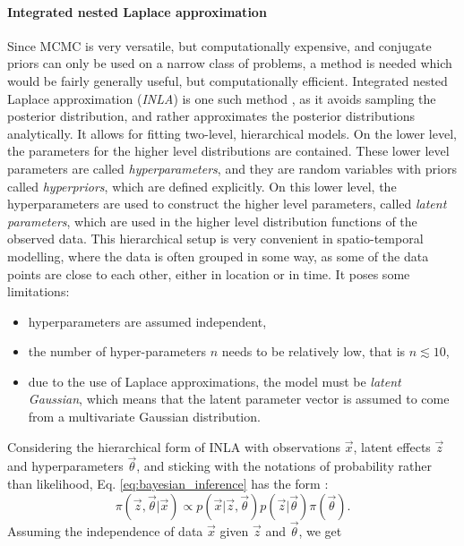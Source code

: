 \paragraph{Integrated nested Laplace approximation}
Since MCMC is very versatile, but computationally expensive, and conjugate priors can only be used on a narrow class of problems, a method is needed which would be fairly generally useful, but computationally efficient. Integrated nested Laplace approximation (\textit{INLA}) is one such method \citep{rue2009approximate,martins2013bayesian}, as it avoids sampling the posterior distribution, and rather approximates the posterior distributions analytically. It allows for fitting two-level, hierarchical models. On the lower level, the parameters for the higher level distributions are contained. These lower level parameters are called \textit{hyperparameters}, and they are random variables with priors called \textit{hyperpriors}, which are defined explicitly. On this lower level, the hyperparameters are used to construct the higher level parameters, called \textit{latent parameters}, which are used in the higher level distribution functions of the observed data. This hierarchical setup is very convenient in spatio-temporal modelling, where the data is often grouped in some way, as some of the data points are close to each other, either in location or in time. It poses some limitations:
\begin{itemize}
    \item hyperparameters are assumed independent,
    \item the number of hyper-parameters $n$ needs to be relatively low, that is $n \lesssim 10$,
    \item due to the use of Laplace approximations, the model must be \textit{latent Gaussian}, which means that the latent parameter vector is assumed to come from a multivariate Gaussian distribution.
\end{itemize}
Considering the hierarchical form of INLA with observations $\vec{x}$, latent effects $\vec{z}$ and hyperparameters $\vec{\theta}$, and sticking with the notations of probability rather than likelihood, Eq. \ref{eq:bayesian_inference} has the form \citep{gomez2020bayesian}:
\begin{equation}
    \pi(\vec{z}, \vec{\theta}|\vec{x}) \propto p(\vec{x}|\vec{z}, \vec{\theta}) p(\vec{z}|\vec{\theta}) \pi(\vec{\theta}).
    \label{eq:bayesian_hierarchical}
\end{equation}
Assuming the independence of data $\vec{x}$ given $\vec{z}$ and $\vec{\theta}$, we get
